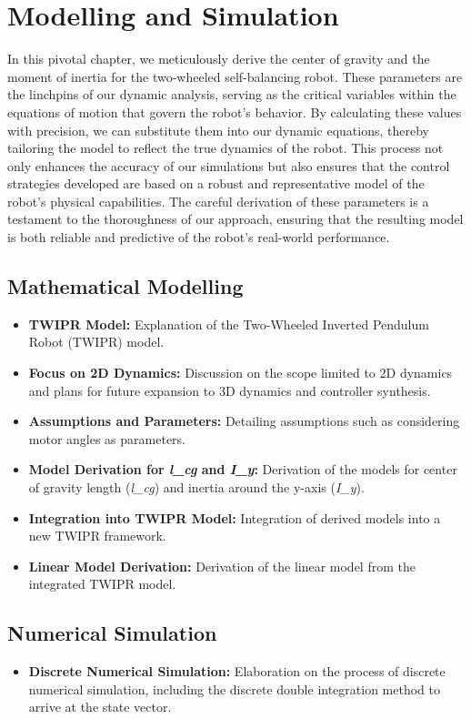 \chapter{Modelling and Simulation}

\graphicspath{{./Figures/Modeling}}

In this pivotal chapter, we meticulously derive the center of gravity and the moment of inertia for the two-wheeled self-balancing robot. These parameters are the linchpins of our dynamic analysis, serving as the critical variables within the equations of motion that govern the robot's behavior. By calculating these values with precision, we can substitute them into our dynamic equations, thereby tailoring the model to reflect the true dynamics of the robot. This process not only enhances the accuracy of our simulations but also ensures that the control strategies developed are based on a robust and representative model of the robot's physical capabilities. The careful derivation of these parameters is a testament to the thoroughness of our approach, ensuring that the resulting model is both reliable and predictive of the robot's real-world performance.
\newpage

\section{Mathematical Modelling}
\begin{itemize}
	\item \textbf{TWIPR Model:} Explanation of the Two-Wheeled Inverted Pendulum Robot (TWIPR) model.
	\item \textbf{Focus on 2D Dynamics:} Discussion on the scope limited to 2D dynamics and plans for future expansion to 3D dynamics and controller synthesis.
	\item \textbf{Assumptions and Parameters:} Detailing assumptions such as considering motor angles as parameters.
	\item \textbf{Model Derivation for \textit{l\_cg} and \textit{I\_y}:} Derivation of the models for center of gravity length (\textit{l\_cg}) and inertia around the y-axis (\textit{I\_y}).
	\item \textbf{Integration into TWIPR Model:} Integration of derived models into a new TWIPR framework.
	\item \textbf{Linear Model Derivation:} Derivation of the linear model from the integrated TWIPR model.
\end{itemize}

\section{Numerical Simulation}
\begin{itemize}
	\item \textbf{Discrete Numerical Simulation:} Elaboration on the process of discrete numerical simulation, including the discrete double integration method to arrive at the state vector.
\end{itemize}

